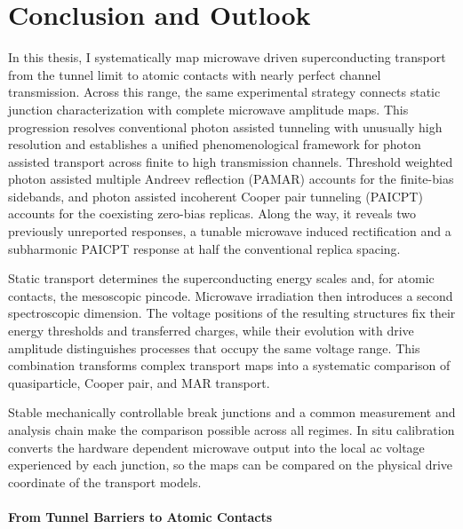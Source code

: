 
\chapter{Conclusion and Outlook}
\label{ch:conclusion}
\thispagestyle{chapterstart}

    In this thesis, I systematically map microwave driven superconducting transport from the tunnel limit to atomic contacts with nearly perfect channel transmission. Across this range, the same experimental strategy connects static junction characterization with complete microwave amplitude maps. This progression resolves conventional photon assisted tunneling with unusually high resolution and establishes a unified phenomenological framework for photon assisted transport across finite to high transmission channels. Threshold weighted photon assisted multiple Andreev reflection (PAMAR) accounts for the finite-bias sidebands, and photon assisted incoherent Cooper pair tunneling (PAICPT) accounts for the coexisting zero-bias replicas. Along the way, it reveals two previously unreported responses, a tunable microwave induced rectification and a subharmonic PAICPT response at half the conventional replica spacing.

    Static transport determines the superconducting energy scales and, for atomic contacts, the mesoscopic pincode. Microwave irradiation then introduces a second spectroscopic dimension. The voltage positions of the resulting structures fix their energy thresholds and transferred charges, while their evolution with drive amplitude distinguishes processes that occupy the same voltage range. This combination transforms complex transport maps into a systematic comparison of quasiparticle, Cooper pair, and MAR transport.

    Stable mechanically controllable break junctions and a common measurement and analysis chain make the comparison possible across all regimes. In situ calibration converts the hardware dependent microwave output into the local ac voltage experienced by each junction, so the maps can be compared on the physical drive coordinate of the transport models.

    \subsubsection*{From Tunnel Barriers to Atomic Contacts}


